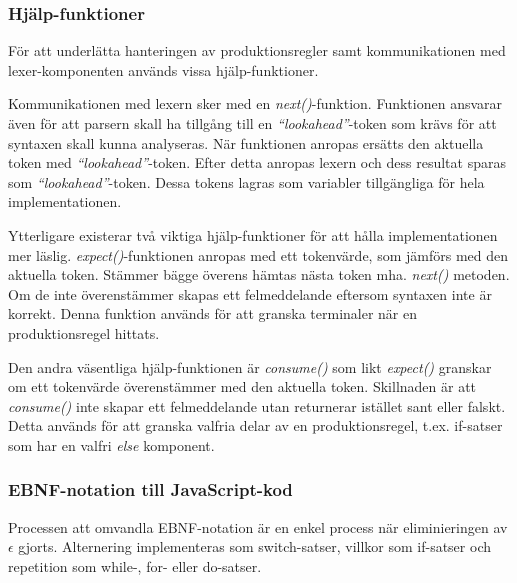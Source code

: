 
\subsubsection{Hjälp-funktioner}

För att underlätta hanteringen av produktionsregler samt kommunikationen med
lexer-komponenten används vissa hjälp-funktioner.

Kommunikationen med lexern sker med en \textit{next()}-funktion. Funktionen
ansvarar även för att parsern skall ha tillgång till en
\textit{``lookahead''}-token som krävs för att syntaxen skall kunna
analyseras. När funktionen anropas ersätts den aktuella token med
\textit{``lookahead''}-token.  Efter detta anropas lexern och dess resultat
sparas som \textit{``lookahead''}-token. Dessa tokens lagras som variabler tillgängliga för
hela implementationen.

Ytterligare existerar två viktiga hjälp-funktioner för att hålla
implementationen mer läslig. \textit{expect()}-funktionen anropas med ett
tokenvärde, som jämförs med den aktuella token. Stämmer bägge överens hämtas
nästa token mha. \textit{next()} metoden. Om de inte överenstämmer skapas ett
felmeddelande eftersom syntaxen inte är korrekt. Denna funktion används för
att granska terminaler när en produktionsregel hittats.

Den andra väsentliga hjälp-funktionen är \textit{consume()} som likt
\textit{expect()} granskar om ett tokenvärde överenstämmer med den aktuella
token. Skillnaden är att \textit{consume()} inte skapar ett felmeddelande utan
returnerar istället sant eller falskt. Detta används för att granska valfria
delar av en produktionsregel, t.ex. if-satser som har en valfri \textit{else}
komponent.

\subsubsection{EBNF-notation till JavaScript-kod}

Processen att omvandla EBNF-notation är en enkel process när eliminieringen av
$\epsilon$ gjorts. Alternering implementeras som switch-satser, villkor som
if-satser och repetition som while-, for- eller do-satser.

